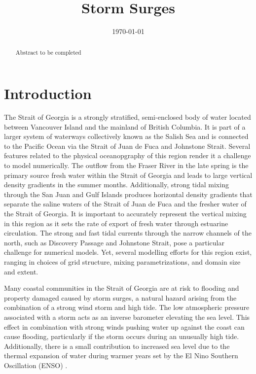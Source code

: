 \documentclass[pdftex,10pt]{article}
\title{Storm Surges}
\date{\today}
\begin{document}
\maketitle

\begin{abstract}
Abstract to be completed
\end{abstract}

\section{Introduction}\label{sec:intro}



The Strait of Georgia is a strongly stratified, semi-enclosed body of water located between Vancouver Island and the mainland of British Columbia. It is part of a larger system of waterways collectively known as the Salish Sea and is connected to the Pacific Ocean via the Strait of Juan de Fuca and Johnstone Strait. Several features related to the physical oceanopgraphy of this region render it a challenge to model numerically. The outflow from the Fraser River in the late spring is the primary source fresh water within the Strait of Georgia and leads to large vertical density gradients in the summer months. Additionally, strong tidal mixing through the San Juan and Gulf Islands produces horizontal density gradients that separate the saline waters of the Strait of Juan de Fuca and the fresher water of the Strait of Georgia. It is important to accurately represent the vertical mixing in this region as it sets the rate of export of fresh water through estuarine circulation. The strong and fast tidal currents through the narrow channels of the north, such as Discovery Passage and Johnstone Strait, pose a particular challenge for numerical models. Yet, several modelling efforts for this region exist, ranging in choices of grid structure, mixing parametrizations, and domain size and extent. 



Many coastal communities in the Strait of Georgia are at risk to flooding and property damaged caused by storm surges, a natural hazard arising from the combination of a strong wind storm and high tide. The low atmospheric pressure associated with a storm acts as an inverse barometer elevating the sea level. This effect in combination with strong winds pushing water up against the coast can cause flooding, particularly if the storm occurs during an unusually high tide.  Additionally, there is a small contribution to increased sea level due to the thermal expansion of water during warmer years set by the El Nino Southern Oscillation (ENSO) \citep{abeys2011extreme}. %
\end{document}
